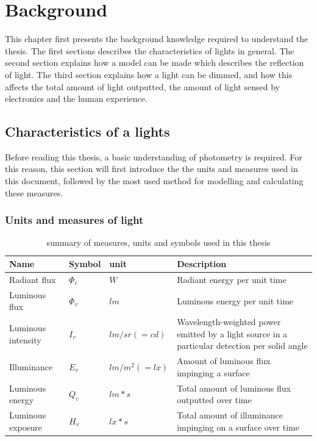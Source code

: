\chapter{Background}
\label{chp:Background}
This chapter first presents the background knowledge required to understand the thesis. The first sections describes the characteristics of lights in general. The second section explains how a model can be made which describes the reflection of light. The third section explains how a light can be dimmed, and how this affects the total amount of light outputted, the amount of light sensed by electronics and the human experience.

\section{Characteristics of a lights}
\label{sec:Characteristics of light}
Before reading this thesis, a basic understanding of photometry is required. For this reason, this section will first introduce the the units and measures used in this document, followed by the most used method for modelling and calculating these measures.

\subsection{Units and measures of light}

\begin{table}[h]
	\centering
	\label{Photometric_measures}
	\begin{tabular}{llll}
		Name                                   & Symbol  & unit                          & Description                                        \\ \hline
		\multicolumn{1}{l|}{Radiant flux}     & $\Phi_e$ & $W$                         & Radiant energy per unit time                        \\
		\multicolumn{1}{l|}{Luminous flux}     & $\Phi_v$ & $lm$                         & Luminous energy per unit time                       \\
		\multicolumn{1}{l|}{Luminous intensity}& $I_v$    & $lm/sr (= cd)$                         & Wavelength-weighted power emitted by a light source in a particular detection per solid angle\\
		\multicolumn{1}{l|}{Illuminance}       & $E_v$    & $lm/m^2 (= lx)$              & Amount of luminous flux impinging a surface       \\
		\multicolumn{1}{l|}{Luminous energy}   & $Q_v$    & $lm*s$                       & Total amount of luminous flux outputted over time \\
		\multicolumn{1}{l|}{Luminous exposure} & $H_v$    & $lx*s$                       & Total amount of  illuminance impinging on a surface over time  \\
	\end{tabular}
	\caption{summary of measures, units and symbols used in this thesis}
\end{table}

